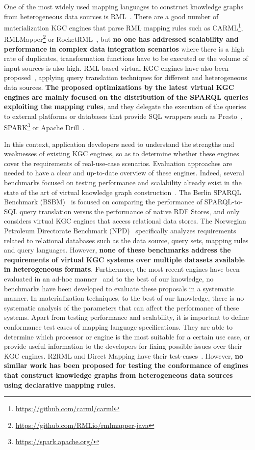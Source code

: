 One of the most widely used mapping languages to construct knowledge graphs from heterogeneous data sources is RML~\citep{dimou2014rml}. There are a good number of materialization KGC engines that parse RML mapping rules such as CARML\footnote{\url{https://github.com/carml/carml}}, RMLMapper\footnote{\url{https://github.com/RMLio/rmlmapper-java}} or RocketRML~\citep{csimcsek2019rocketrml}, but \textbf{no one has addressed scalability and performance in complex data integration scenarios} where there is a high rate of duplicates, transformation functions have to be executed or the volume of input sources is also high. RML-based virtual KGC engines have also been  proposed~\citep{endris2019ontario,mami2019squerall}, applying query translation techniques for different and heterogeneous data sources. \textbf{The proposed optimizations by the latest virtual KGC engines are mainly focused on the distribution of the SPARQL queries exploiting the mapping rules}, and they delegate the execution of the queries to external platforms or databases that provide SQL wrappers such as Presto~\citep{bershad1988presto}, SPARK\footnote{\url{https://spark.apache.org/}} or Apache Drill~\citep{hausenblas2013apache}.

In this context, application developers need to understand the strengths and weaknesses of existing KGC engines, so as to determine whether these engines cover the requirements of real-use-case scenarios. Evaluation approaches are needed to have a clear and up-to-date overview of these engines. Indeed, several benchmarks focused on testing performance and scalability already exist in the state of the art of virtual knowledge graph construction~\citep{bizer2009berlin,lanti2015npd}. The Berlin SPARQL Benchmark (BSBM)~\citep{bizer2009berlin} is focused on comparing the performance of SPARQL-to-SQL query translation versus the performance of native RDF Stores, and only considers virtual KGC engines that access relational data stores. The Norwegian Petroleum Directorate Benchmark (NPD)~\citep{lanti2015npd} specifically analyzes requirements related to relational databases such as the data source, query sets, mapping rules and query languages. However, \textbf{none of these benchmarks address the requirements of virtual KGC systems over multiple datasets available in heterogeneous formats}. Furthermore, the most recent engines have been evaluated in an ad-hoc manner~\citep{endris2019ontario,mami2019querying} and to the best of our knowledge, no benchmarks have been developed to evaluate these proposals in a systematic manner. In materialization techniques, to the best of our knowledge, there is no systematic analysis of the parameters that can affect the performance of these systems. Apart from testing performance and scalability, it is important to define conformance test cases of mapping language specifications. They are able to determine which processor or engine is the most suitable for a certain use case, or provide useful information to the developers for fixing possible issues over their KGC engines. R2RML and Direct Mapping have their test-cases~\citep{R2RML_test_cases}. However, \textbf{no similar work has been proposed for testing the conformance of engines that construct knowledge graphs from heterogeneous data sources using declarative mapping rules}.

